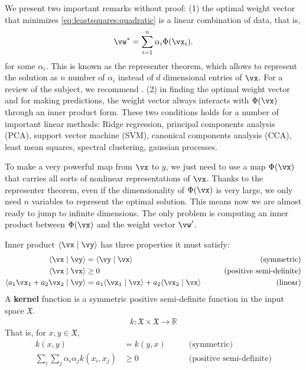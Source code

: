 \documentclass[a4paper,11pt]{exam}
\newcounter{ct}
\newcommand{\braket}[2]{\ensuremath{\langle#1\mid#2\rangle}}
\newcommand{\field}[1]{\ensuremath{\mathbb{#1}}}
\newcommand{\reals}{\field{R}}
\newcommand{\inputSpace}{\ensuremath{\mathfrak{X}}}
\begin{document}
\begin{questions}
We present two important remarks without proof:
(1) the optimal weight vector that minimizes \eqref{eq:leastsquares:quadratic} is a linear combination of data, that is,
\begin{align}\label{eq:representer:thm}
\vw^\ast = \sum_{i=1}^n \alpha_i \Phi(\vx_i).
\end{align}
for some $\alpha_i$.
This is known as the representer theorem, which allows to represent the solution as $n$ number of $\alpha_i$ instead of $d$ dimensional entries of $\vx$. For a review of the subject, we recommend \citep[Ch 4.2]{Scholkopf2002}.
(2) in finding the optimal weight vector and for making predictions, the weight vector always interacts with $\Phi(\vx)$ through an inner product form.
These two conditions holds for a number of important linear methods: Ridge regression, principal components analysis (PCA), support vector machine (SVM), canonical components analysis (CCA), least mean squares, spectral clustering, gaussian processes.

To make a very powerful map from $\vx$ to $y$, we just need to use a map $\Phi(\vx)$ that carries all sorts of nonlinear representations of $\vx$.
Thanks to the representer theorem, even if the dimensionality of $\Phi(\vx)$ is very large, we only need $n$ variables to represent the optimal solution.
This means now we are almost ready to jump to infinite dimensions.
The only problem is computing an inner product between $\Phi(\vx)$ and the weight vector $\vw'$.

Inner product $\braket{\vx}{\vy}$ has three properties it must satisfy:
\begin{align}\label{eq:innerproduct}
	\braket{\vx}{\vy} &= \braket{\vy}{\vx} \qquad &\text{(symmetric)} \\
	\braket{\vx}{\vx} &\geq 0 \qquad &\text{(positive semi-definite)}\\
	\braket{a_1 \vx_1 + a_2 \vx_2}{\vy} &= a_1 \braket{\vx_1}{\vx} + a_2 \braket{\vx_2}{\vx} \qquad &\text{(linear)}
\end{align}
A \textbf{kernel} function is a symmetric positive semi-definite function in the input space $\inputSpace$.
\begin{align}
	k: \inputSpace \times \inputSpace \to \reals
\end{align}
That is, for $x, y \in \inputSpace$,
\begin{align}\label{eq:kernelreq}
	k(x,y) &= k(y,x) \qquad &\text{(symmetric)} \\
	\sum_i \sum_j \alpha_i \alpha_j k(x_i,x_j) &\geq 0    \qquad &\text{(positive semi-definite)}
\end{align}


\end{questions}
\end{document}
